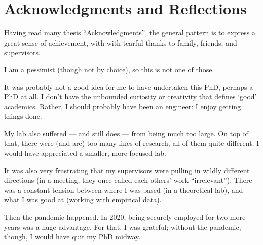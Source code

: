 

\bigskip

\begingroup
\let\clearpage\relax
\let\cleardoublepage\relax
\let\cleardoublepage\relax
\chapter*{Acknowledgments and Reflections}

Having read many thesis ``Acknowledgments'', the general pattern is to express a great sense of achievement, with with tearful thanks to family, friends, and supervisors.

\noindent I am a pessimist (though not by choice), so this is not one of those.

It was probably not a good idea for me to have undertaken this PhD, perhaps a PhD at all.
I don't have the unbounded curiosity or creativity that defines `good' academics.
Rather, I should probably have been an engineer: I enjoy getting things done.

My lab also suffered --- and still does --- from being much too large. 
On top of that, there were (and are) too many lines of research, all of them quite different.
I would have appreciated a smaller, more focused lab.

It was also very frustrating that my supervisors were pulling in wildly different directions (in a meeting, they once called each others' work ``irrelevant'').
There was a constant tension between where I was based (in a theoretical lab), and what I was good at (working with empirical data).

Then the pandemic happened.
In 2020, being securely employed for two more years was a huge advantage.
For that, I was grateful; without the pandemic, though, I would have quit my PhD midway.

